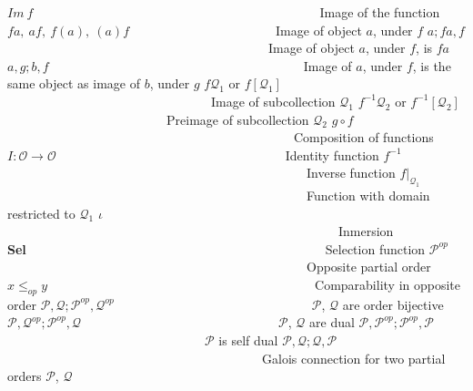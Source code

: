 \documentclass [12pt]{book}
\begin{document}
$Im~f$~~~~~~~~~~~~~~~~~~~~~~~~~~~~~~~~~~~~~~~~~~~~~Image of the function\newline
$fa,~af,~f(a),~(a)f$~~~~~~~~~~~~~~~~~~~~~~~Image of object $a$, under $f$\newline
$a;fa,f$~~~~~~~~~~~~~~~~~~~~~~~~~~~~~~~~~~~~~~~~~Image of object $a$, under $f$, is $fa$\newline
$a,g;b,f$~~~~~~~~~~~~~~~~~~~~~~~~~~~~~~~~~~~~~~~~Image of $a$, under $f$, is the same object as image of $b$, under $g$\newline
$f\mathcal Q_1$ or $f[\mathcal Q_1]$~~~~~~~~~~~~~~~~~~~~~~~~~~~~~~~~Image of subcollection	$\mathcal Q_1$\newline
$f^{-1}\mathcal Q_2$ or $f^{-1}[\mathcal Q_2]$~~~~~~~~~~~~~~~~~~~~~~~~~Preimage of subcollection $\mathcal Q_2$\newline
$g\circ f$~~~~~~~~~~~~~~~~~~~~~~~~~~~~~~~~~~~~~~~~~~~~~Composition of functions\newline
$I:\mathcal O\rightarrow\mathcal O$~~~~~~~~~~~~~~~~~~~~~~~~~~~~~~~~~~~~Identity function\newline
$f^{-1}$~~~~~~~~~~~~~~~~~~~~~~~~~~~~~~~~~~~~~~~~~~~~~~~Inverse function\newline
$f|_{\mathcal Q_1}$~~~~~~~~~~~~~~~~~~~~~~~~~~~~~~~~~~~~~~~~~~~~~~~Function with domain restricted to $\mathcal Q_1$\newline
$\iota$~~~~~~~~~~~~~~~~~~~~~~~~~~~~~~~~~~~~~~~~~~~~~~~~~~~~Inmersion\newline
\textbf{Sel}~~~~~~~~~~~~~~~~~~~~~~~~~~~~~~~~~~~~~~~~~~~~~~~Selection function\newline
$\mathcal P^{op}$~~~~~~~~~~~~~~~~~~~~~~~~~~~~~~~~~~~~~~~~~~~~~~~Opposite partial  order\newline
$x\leq_{op}y$~~~~~~~~~~~~~~~~~~~~~~~~~~~~~~~~~~~~~~~~~~Comparability in opposite order\newline
$\mathcal P,\mathcal Q;\mathcal P^{op},\mathcal Q^{op}$~~~~~~~~~~~~~~~~~~~~~~~~~~~~~~~$\mathcal P$, $\mathcal Q$ are order bijective\newline
$\mathcal P,\mathcal Q^{op};\mathcal P^{op},\mathcal Q$~~~~~~~~~~~~~~~~~~~~~~~~~~~~~~~$\mathcal P$, $\mathcal Q$ are dual\newline
$\mathcal P,\mathcal P^{op};\mathcal P^{op},\mathcal P$~~~~~~~~~~~~~~~~~~~~~~~~~~~~~~~$\mathcal P$ is self dual\newline
$\mathcal P,\mathcal Q;\mathcal Q,\mathcal P$~~~~~~~~~~~~~~~~~~~~~~~~~~~~~~~~~~~~~~~~Galois connection for two partial orders $\mathcal P$, $\mathcal Q$\newline
\end{document}
